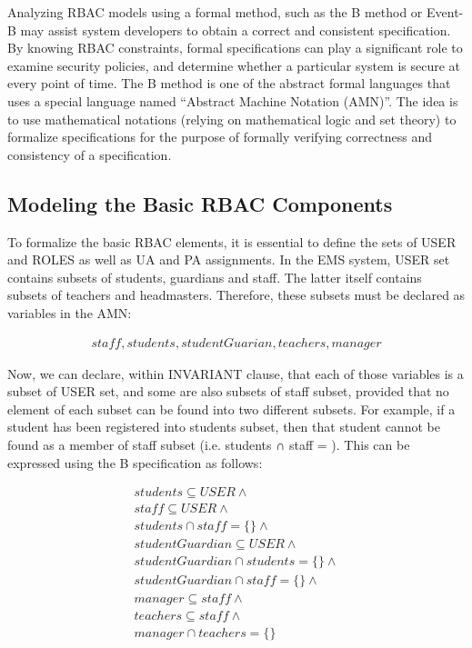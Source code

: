     Analyzing RBAC models using a formal method, such as the B method or Event-B may assist system developers to obtain a correct and consistent specification.  By knowing RBAC constraints, formal specifications can play a significant role to examine security policies, and determine whether a particular system is secure at every point of time.
The B method is one of the abstract formal languages that uses a special language named “Abstract Machine Notation (AMN)”.  The idea is to use mathematical notations (relying on mathematical logic and set theory) to formalize specifications for the purpose of formally verifying correctness and consistency of a specification.

\subsection{Modeling the Basic RBAC Components}

To formalize the basic RBAC elements, it is essential to define the sets of USER and ROLES as well as UA and PA assignments.  In the EMS system, USER set contains subsets of students, guardians and staff.  The latter itself contains subsets of teachers and headmasters.  Therefore, these subsets must be declared as variables in the AMN: 

\begin{align*}
staff, students, studentGuarian, teachers, manager
\end{align*}


Now, we can declare, within INVARIANT clause, that each of those variables is a subset of USER set, and some are also subsets of staff subset, provided that no element of each subset can be found into two different subsets.  For example, if a student has been registered into students subset, then that student cannot be found as a member of staff subset (i.e. students ∩ staff = { }).  This can be expressed using the B specification as follows:


\begin{align*}
students \subseteq USER  \wedge \\
staff \subseteq USER  \wedge \\
students \cap staff = \{ \}  \wedge \\
studentGuardian \subseteq USER   \wedge \\
studentGuardian\cap students = \{ \}  \wedge \\
studentGuardian \cap staff = \{ \}   \wedge \\
manager \subseteq staff   \wedge \\
teachers \subseteq staff   \wedge \\
manager \cap teachers = \{ \} \\ 
\end{align*}



